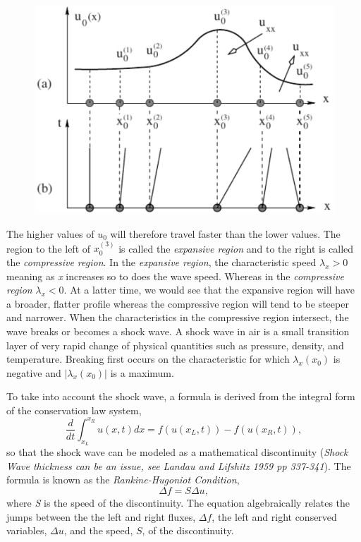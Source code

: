 \documentclass[]{article}
\begin{document}
			\begin{figure}[h] 	
				\centering
				\includegraphics[scale=.50]{WaveDistortion}
				\caption{}
				\label{WaveDistortion}
			\end{figure}
			The higher values of $ u_0$ will therefore travel faster than the lower values. The region to the left of $ x_0^{(3)} $ is called the \textit{expansive region} and to the right is called the \textit{compressive region}. In the \textit{expansive region}, the characteristic speed $ \lambda_x > 0$ meaning as \textit{x} increases so to does the wave speed. Whereas in the \textit{compressive region} $ \lambda_x < 0 $. At a latter time, we would see that the expansive region will have a broader, flatter profile whereas the compressive region will tend to be steeper and narrower. When the characteristics in the compressive region intersect, the wave breaks or becomes a shock wave. A shock wave in air is a small transition layer of very rapid change of physical quantities such as pressure, density, and temperature. Breaking first occurs on the characteristic for which $ \lambda_x(x_0) $ is negative and $ |\lambda_x(x_0)| $ is a maximum.
	
			To take into account the shock wave, a formula is derived from the integral form of the conservation law system,
			\begin{equation}
				\frac{d}{dt}\int_{x_L}^{x_R}u(x,t)dx = f(u(x_L, t)) - f(u(x_R,t)),
			\end{equation}so that the shock wave can be modeled as a mathematical discontinuity (\textit{Shock Wave thickness can be an issue, see Landau and Lifshitz 1959 pp 337-341}). The formula is known as the \textit{Rankine-Hugoniot Condition},
			\begin{equation}
				\Delta f = S \Delta u,
				\label{RHC}
			\end{equation}
			where \textit{S} is the speed of the discontinuity. The equation algebraically relates the jumps between the the left and right fluxes, $ \Delta f $, the left and right conserved variables, $ \Delta u $, and the speed, $ S $, of the discontinuity.
	
\end{document}
